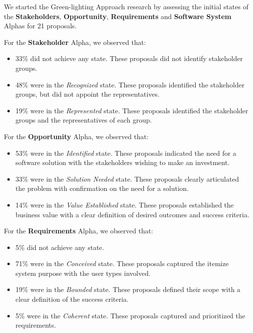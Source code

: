 We started the Green-lighting Approach research by assessing the
initial states of the \textbf{Stakeholders}, \textbf{Opportunity},
\textbf{Requirements} and \textbf{Software System} Alphas for 21 proposals.

For the \textbf{Stakeholder} Alpha, we observed that:
\begin{itemize}
\itemsep1pt\parskip0pt
\item
  33\% did not achieve any state. These proposals did not identify
  stakeholder groups.
\item
  48\% were in the \textit{Recognized} state. These proposals identified the
  stakeholder groups, but did not appoint the representatives.
\item
  19\% were in the \textit{Represented} state. These proposals
  identified the stakeholder groups and the representatives of each
  group.
\end{itemize}

For the \textbf{Opportunity} Alpha, we observed that:
\begin{itemize}
\itemsep1pt\parskip0pt
\item
  53\% were in the \textit{Identified} state. These proposals indicated the
  need for a software solution with the stakeholders wishing to make an
  investment.
\item
  33\% were in the \textit{Solution Needed} state. These proposals clearly
  articulated the problem with confirmation on the need for a solution.
\item
  14\% were in the \textit{Value Established} state. These proposals
  established the business value with a clear definition of desired
  outcomes and success criteria.
\end{itemize}

For the \textbf{Requirements} Alpha, we observed that:
\begin{itemize}
\itemsep1pt\parskip0pt
\item
  5\% did not achieve any state.
\item
  71\% were in the \textit{Conceived} state. These proposals captured the 
  itemize system purpose with the user types involved.
\item
  19\% were in the \textit{Bounded} state. These proposals defined their 
  scope with a clear definition of the success criteria.
\item
  5\% were in the \textit{Coherent} state. These proposals captured and
  prioritized the requirements.
\end{itemize}

